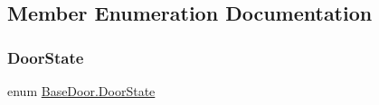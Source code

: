 \subsection{Member Enumeration Documentation}
\mbox{\label{class_base_door_a22e038571daf23b362eb8aaedc78cb43}} 
\subsubsection{\texorpdfstring{Door\+State}{DoorState}}
{\footnotesize\ttfamily enum \mbox{\hyperlink{class_base_door_a22e038571daf23b362eb8aaedc78cb43}{Base\+Door.\+Door\+State}}\hspace{0.3cm}{\ttfamily [strong]}}

